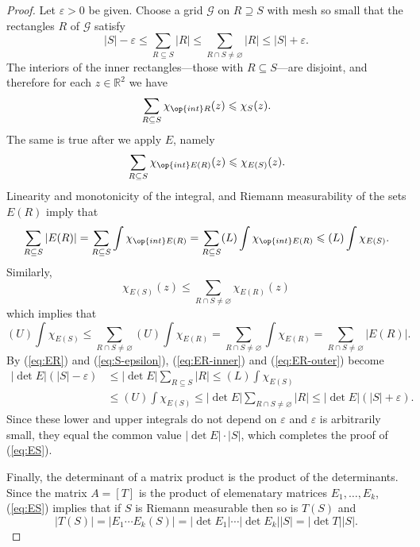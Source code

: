 \documentclass[11pt]{article}
\begin{document}
\begin{proof}
  Let $\varepsilon > 0$ be given.  Choose a grid $\mathcal{G}$ on $R \supseteq S$ with mesh so small that the rectangles $R$ of $\mathcal{G}$ satisfy
  \begin{equation}
    \label{eq:S-epsilon}
    |S| - \varepsilon \leqslant \sum_{R \subseteq S} |R| \leqslant \sum_{R \cap S \ne \varnothing} |R| \leqslant |S| + \varepsilon.
  \end{equation}
  The interiors of the inner rectangles---those with $R \subseteq S$---are disjoint, and therefore for each $z \in \mathbb{R}^2$ we have
  \[
    \sum_{R \subseteq S} \chi_{\op{int} R}(z) \leqslant \chi_S(z).
  \]
  The same is true after we apply $E$, namely
  \[
    \sum_{R \subseteq S} \chi_{\op{int} E(R)}(z) \leqslant \chi_{E(S)}(z).
  \]
  Linearity and monotonicity of the integral, and Riemann measurability of the sets $E(R)$ imply that
  \begin{equation}
    \label{eq:ER-inner}
    \sum_{R\subseteq S} |E(R)| = \sum_{R \subseteq S} \int \chi_{\op{int} E(R)} = \sum_{R\subseteq S} (L) \int \chi_{\op{int} E(R)} \leqslant (L) \int \chi_{E(S)}.
  \end{equation}
  Similarly,
  \[
    \chi_{E(S)}(z) \leqslant \sum_{R \cap S \ne \varnothing} \chi_{E(R)}(z)
  \]
  which implies that
  \begin{equation}
    \label{eq:ER-outer}
    (U) \int \chi_{E(S)} \leqslant \sum_{R\cap S\ne\varnothing} (U) \int \chi_{E(R)} = \sum_{R\cap S\ne\varnothing} \int \chi_{E(R)} = \sum_{R\cap S\ne\varnothing} |E(R)|.
  \end{equation}
  By (\ref{eq:ER}) and (\ref{eq:S-epsilon}), (\ref{eq:ER-inner}) and (\ref{eq:ER-outer}) become
  \begin{align*}
    |\det E| (|S| - \varepsilon) &\leqslant |\det E| \sum_{R \subseteq S} |R| \leqslant (L) \int \chi_{E(S)} \\ &\leqslant (U) \int \chi_{E(S)} \leqslant |\det E| \sum_{R \cap S \ne \varnothing} |R| \leqslant |\det E| (|S| + \varepsilon).
  \end{align*}
  Since these lower and upper integrals do not depend on $\varepsilon$ and $\varepsilon$ is arbitrarily small, they equal the common value $|\det E| \cdot |S|$, which completes the proof of (\ref{eq:ES}).

  Finally, the determinant of a matrix product is the product of the determinants.  Since the matrix $A = [T]$ is the product of elemenatary matrices $E_1, \dots, E_k$, (\ref{eq:ES}) implies that if $S$ is Riemann measurable then so is $T(S)$ and
  \[
    |T(S)| = |E_1 \cdots E_k(S)| = |\det E_1| \cdots |\det E_k| |S| = |\det T| |S|.
  \]
\end{proof}
\end{document}
